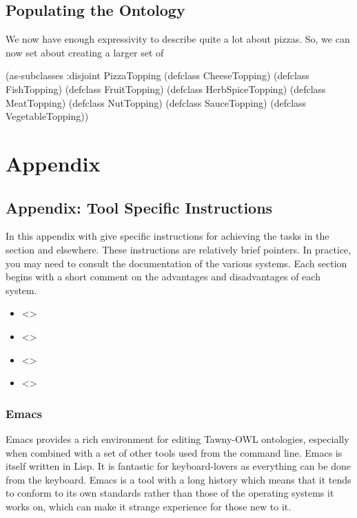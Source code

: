 \documentclass[11pt]{article}
\begin{document}
\subsection{Populating the Ontology}
\label{sec-5-3}

We now have enough expressivity to describe quite a lot about pizzas. So, we
can now set about creating a larger set of 

\begin{tawny}
(as-subclasses
 :disjoint
 PizzaTopping
 (defclass CheeseTopping)
 (defclass FishTopping)
 (defclass FruitTopping)
 (defclass HerbSpiceTopping)
 (defclass MeatTopping)
 (defclass NutTopping)
 (defclass SauceTopping)
 (defclass VegetableTopping))
\end{tawny}




\section{Appendix}
\label{sec-6}

\subsection{Appendix: Tool Specific Instructions}
\label{sec-6-1}

In this appendix with give specific instructions for achieving the tasks
in the \label{/getting/started-Getting-Started} section and elsewhere. These
instructions are relatively brief pointers. In practice, you may need to
consult the documentation of the various systems. Each section begins
with a short comment on the advantages and disadvantages of each system.

\begin{itemize}
\item <>
\item <>
\item <>
\item <>
\end{itemize}

\subsubsection{Emacs}
\label{sec-6-1-1}

Emacs provides a rich environment for editing Tawny-OWL ontologies,
especially when combined with a set of other tools used from the command
line. Emacs is itself written in Lisp. It is fantastic for
keyboard-lovers as everything can be done from the keyboard. Emacs is a
tool with a long history which means that it tends to conform to its own
standards rather than those of the operating systems it works on, which
can make it strange experience for those new to it.
\end{document}

